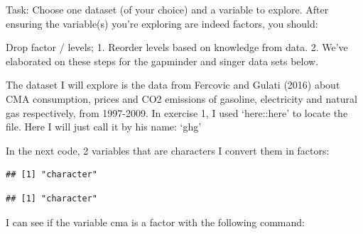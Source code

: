 \documentclass[]{article}
\newenvironment{Shaded}{\begin{snugshade}}{\end{snugshade}}
\newcommand{\CommentTok}[1]{\textcolor[rgb]{0.56,0.35,0.01}{\textit{#1}}}
\newcommand{\KeywordTok}[1]{\textcolor[rgb]{0.13,0.29,0.53}{\textbf{#1}}}
\newcommand{\NormalTok}[1]{#1}
\newcommand{\OperatorTok}[1]{\textcolor[rgb]{0.81,0.36,0.00}{\textbf{#1}}}
\newcommand{\StringTok}[1]{\textcolor[rgb]{0.31,0.60,0.02}{#1}}
\begin{document}
Task: Choose one dataset (of your choice) and a variable to explore.
After ensuring the variable(s) you're exploring are indeed factors, you
should:

Drop factor / levels; 1. Reorder levels based on knowledge from data. 2.
We've elaborated on these steps for the gapminder and singer data sets
below.

The dataset I will explore is the data from Fercovic and Gulati (2016)
about CMA consumption, prices and CO2 emissions of gasoline, electricity
and natural gas respectively, from 1997-2009. In exercise 1, I used
`here::here' to locate the file. Here I will just call it by his name:
`ghg'

In the next code, 2 variables that are characters I convert them in
factors:

\begin{Shaded}
\end{Shaded}

\begin{verbatim}
## [1] "character"
\end{verbatim}

\begin{Shaded}
\end{Shaded}

\begin{verbatim}
## [1] "character"
\end{verbatim}

\begin{Shaded}
\end{Shaded}

I can see if the variable cma is a factor with the following command:
\end{document}
